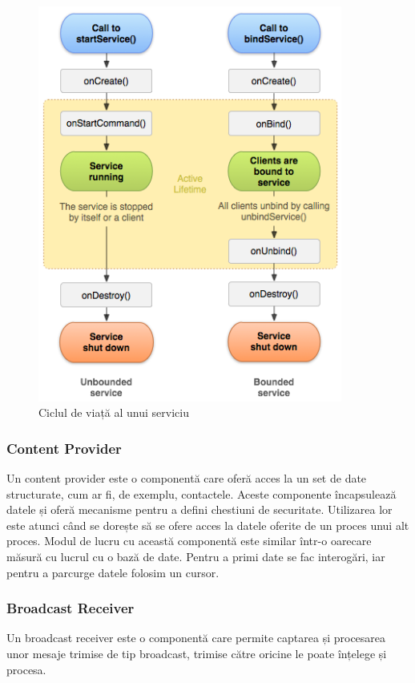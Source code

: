 \documentclass[12pt,a4paper]{article}
\begin{document}
\begin{figure}[h]
\centering
\includegraphics[width=10cm]{figures/service_lifecycle.png}
\caption{Ciclul de viață al unui serviciu}
\label{fig:service_lifecycle}
\end{figure}

\subsubsection{Content Provider}
Un content provider este o componentă care oferă acces la un set de date structurate, cum ar fi, de exemplu, contactele. Aceste componente încapsulează datele și oferă mecanisme pentru a defini chestiuni de securitate. Utilizarea lor este atunci când se dorește să se ofere acces la datele oferite de un proces unui alt proces.
Modul de lucru cu această componentă este similar într-o oarecare măsură cu lucrul cu o bază de date. Pentru a primi date se fac interogări, iar pentru a parcurge datele folosim un cursor.

\subsubsection{Broadcast Receiver}
Un broadcast receiver este o componentă care permite captarea și procesarea unor mesaje trimise de tip broadcast, trimise către oricine le poate înțelege și procesa.
\end{document}
